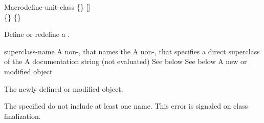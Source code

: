 \documentclass[10pt,twoside,english,pdftex]{article}
\begin{document}

\begin{functiondoc}{Macro}{define-unit-class}{ 
   \code{(}\{\}\superstar\code{)}
   [] \\
   \code{(}\{\}\superstar\code{)}
   \{\}\superstar{}
   \returns{} }
%
%
%

\fnsyntax

\fnpurpose Define or redefine a .

\fnpackage {}

\fnmodule {}

\fnargs
\begin{args}{superclass-name}
 A non-\nil,  that names the
 A non-\nil,  that specifies a
direct superclass of the    
\arg[documentation] A documentation string (not evaluated)
 See below
 See below
 A new or modified  object
\end{args}

\fnreturns The newly defined or modified  object.

\fnerrors The specified  do not include at least
one  name.  This error is signaled on class finalization.


\end{functiondoc}
\end{document}
